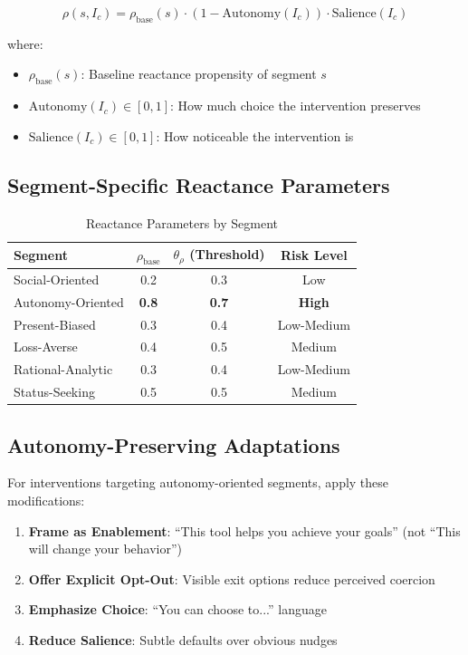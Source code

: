 \begin{equation}
\rho(s, I_c) = \rho_{\text{base}}(s) \cdot (1 - \text{Autonomy}(I_c)) \cdot \text{Salience}(I_c)
\end{equation}

where:
\begin{itemize}[nosep]
\item $\rho_{\text{base}}(s)$: Baseline reactance propensity of segment $s$
\item $\text{Autonomy}(I_c) \in [0,1]$: How much choice the intervention preserves
\item $\text{Salience}(I_c) \in [0,1]$: How noticeable the intervention is
\end{itemize}

\subsection{Segment-Specific Reactance Parameters}

\begin{table}[htbp]
\centering
\caption{Reactance Parameters by Segment}
\label{tab:qq-reactance}
\renewcommand{\arraystretch}{1.3}
\begin{tabular}{@{}lccc@{}}
\toprule
\textbf{Segment} & $\rho_{\text{base}}$ & $\theta_{\rho}$ (Threshold) & \textbf{Risk Level} \\
\midrule
Social-Oriented & 0.2 & 0.3 & Low \\
Autonomy-Oriented & \textbf{0.8} & \textbf{0.7} & \textbf{High} \\
Present-Biased & 0.3 & 0.4 & Low-Medium \\
Loss-Averse & 0.4 & 0.5 & Medium \\
Rational-Analytic & 0.3 & 0.4 & Low-Medium \\
Status-Seeking & 0.5 & 0.5 & Medium \\
\bottomrule
\end{tabular}
\end{table}

\subsection{Autonomy-Preserving Adaptations}

For interventions targeting autonomy-oriented segments, apply these modifications:

\begin{enumerate}
\item \textbf{Frame as Enablement}: ``This tool helps you achieve your goals'' (not ``This will change your behavior'')
\item \textbf{Offer Explicit Opt-Out}: Visible exit options reduce perceived coercion
\item \textbf{Emphasize Choice}: ``You can choose to...'' language
\item \textbf{Reduce Salience}: Subtle defaults over obvious nudges
\end{enumerate}


